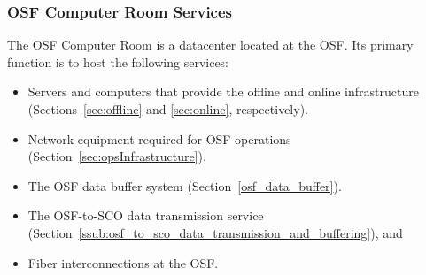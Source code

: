 \subsubsection{OSF Computer Room Services}
\label{sec:osf_computer_room}
The OSF Computer Room is a 
datacenter located at the \ac{OSF}.  Its primary function is to host the following services:
\begin{itemize}[itemsep=-0.5em]
    \item Servers and computers that provide the offline and online infrastructure (Sections~\ref{sec:offline} and \ref{sec:online}, respectively).
    \item Network equipment required for OSF operations (Section~\ref{sec:opsInfrastructure}).
    \item The OSF data buffer system (Section~\ref{osf_data_buffer}).
    \item The OSF-to-SCO data transmission service (Section~\ref{ssub:osf_to_sco_data_transmission_and_buffering}), and
    \item Fiber interconnections at the OSF.
\end{itemize}






